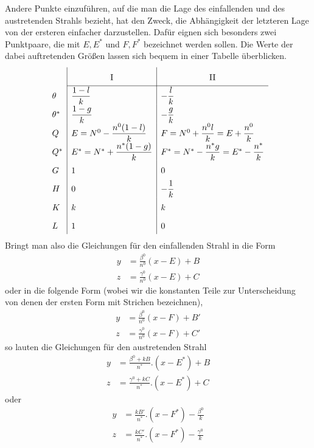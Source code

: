 Andere Punkte einzuführen, auf die man die Lage des einfallenden und des austretenden Strahls bezieht, hat den Zweck, die Abhängigkeit der letzteren Lage von der ersteren einfacher darzustellen. Dafür eignen sich besonders zwei Punktpaare, die mit $E,E^*$ und $F,F^*$ bezeichnet werden sollen. Die Werte der dabei auftretenden Größen lassen sich bequem in einer Tabelle überblicken.
\[
\renewcommand{\arraystretch}{1.8}
\begin{array}{l|l|l}
&\multicolumn{1}{c|}{\mathrm{I}}&\multicolumn{1}{c}{\mathrm{II}}\\\cline{2-3}
\theta&\dfrac{1-l}{k}&-\dfrac{l}{k}\\
\theta^*&\dfrac{1-g}{k}&-\dfrac{g}{k}\\
Q&E=N^0-\dfrac{n^0(1-l)}{k}&F=N^0+\dfrac{n^0l}{k}=E+\dfrac{n^0}{k}\\
Q^*&E^*=N^*+\dfrac{n^*(1-g)}{k}&F^*=N^*-\dfrac{n^*g}{k}=E^*-\dfrac{n^*}{k}\\
G&1&0\\
H&0&-\dfrac1k\\
K&k&k\\
L&1&0
\end{array}
\]
Bringt man also die Gleichungen für den einfallenden Strahl in die Form
\[
\begin{aligned}
y&=\frac{\beta^0}{n^0}(x-E)+B\\
z&=\frac{\gamma^0}{n^0}(x-E)+C
\end{aligned}
\]
oder in die folgende Form (wobei wir die konstanten Teile zur Unterscheidung von denen der ersten Form mit Strichen bezeichnen),
\[
\begin{aligned}
y&=\frac{\beta^0}{n^0}(x-F)+B'\\
z&=\frac{\gamma^0}{n^0}(x-F)+C'
\end{aligned}
\]
so lauten die Gleichungen für den austretenden Strahl
\[
\begin{aligned}
y&=\frac{\beta^0+kB}{n^*}.(x-E^*)+B\\
z&=\frac{\gamma^0+kC}{n^*}.(x-E^*)+C
\end{aligned}
\]
oder
\[
\begin{aligned}
y&=\frac{kB'}{n^*}.(x-F^*)-\frac{\beta^0}k\\
z&=\frac{kC'}{n^*}.(x-F^*)-\frac{\gamma^0}k
\end{aligned}
\]

